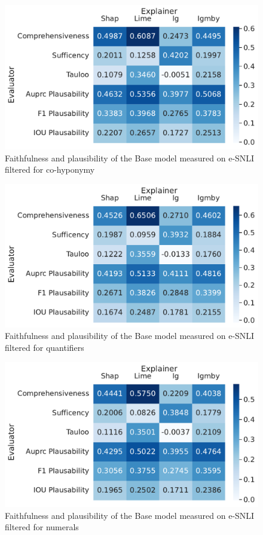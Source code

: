 \begin{figure}[h!]
    \centering
    \includegraphics[width=\textwidth]{./images/ferret_heatmaps_phenomena/default_mnli/co_hyponym.pdf}
    \caption{Faithfulness and plausibility of the Base model measured on \acs{e-SNLI} filtered for co-hyponymy}
    \label{fig:ferret-mnli-co-hyponym}
\end{figure}

\begin{figure}[h!]
    \centering
    \includegraphics[width=\textwidth]{./images/ferret_heatmaps_phenomena/default_mnli/quantifiers.pdf}
    \caption{Faithfulness and plausibility of the Base model measured on \acs{e-SNLI} filtered for quantifiers}
    \label{fig:ferret-mnli-quantifiers}
\end{figure}

\begin{figure}[h!]
    \centering
    \includegraphics[width=\textwidth]{./images/ferret_heatmaps_phenomena/default_mnli/numericals.pdf}
    \caption{Faithfulness and plausibility of the Base model measured on \acs{e-SNLI} filtered for numerals}
    \label{fig:ferret-mnli-numerals}
\end{figure}
